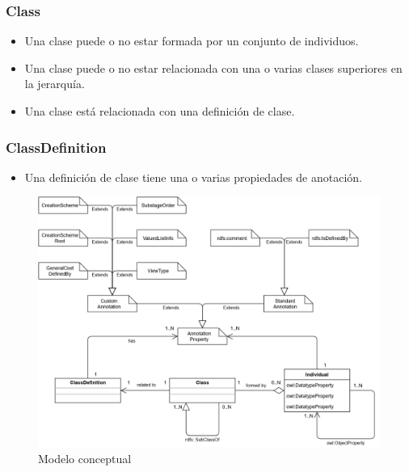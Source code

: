 \subsubsection{Class}
\begin{itemize}
    \item Una clase puede o no estar formada por un conjunto de individuos.
    \item Una clase puede o no estar relacionada con una o varias clases superiores en la jerarquía.
    \item Una clase está relacionada con una definición de clase.
\end{itemize}

\subsubsection{ClassDefinition}
\begin{itemize}
    \item Una definición de clase tiene una o varias propiedades de anotación.
\end{itemize}

\begin{figure}[H]
    \centering
    \includegraphics[scale=0.65]{Figures/Modelo_Conceptual.jpg}
    \caption{Modelo conceptual}
    \label{Diagrama_modelo_conceptual}
\end{figure}

